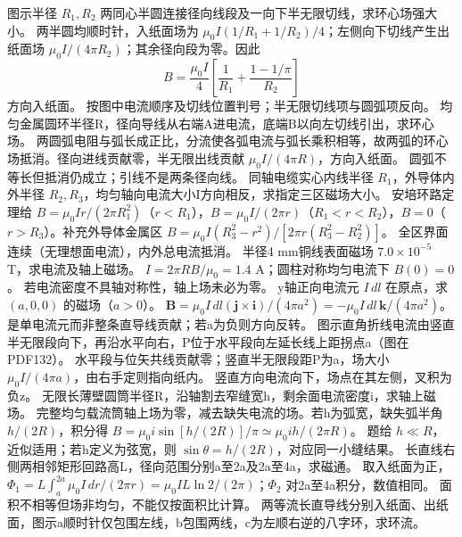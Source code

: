 \problemtext 图示半径 $R_1,R_2$ 两同心半圆连接径向线段及一向下半无限切线，求环心场强大小。
\workings 两半圆均顺时针，入纸面场为 $\mu_0I(1/R_1+1/R_2)/4$；左侧向下切线产生出纸面场 $\mu_0I/(4\pi R_2)$；其余径向段为零。因此
\[
B=\frac{\mu_0I}{4}\left[\frac1{R_1}+\frac{1-1/\pi}{R_2}\right]
\]
方向入纸面。
\crosscheck 按图中电流顺序及切线位置判号；半无限切线项与圆弧项反向。
\problemtext 均匀金属圆环半径R，径向导线从右端A进电流，底端B以向左切线引出，求环心场。
\workings 两圆弧电阻与弧长成正比，分流使各弧电流与弧长乘积相等，故两弧的环心场抵消。径向进线贡献零，半无限出线贡献 $\mu_0I/(4\pi R)$，方向入纸面。
\crosscheck 圆弧不等长但抵消仍成立；引线不是两条径向线。
\problemtext 同轴电缆实心内线半径 $R_1$，外导体内外半径 $R_2,R_3$，均匀轴向电流大小I方向相反，求指定三区磁场大小。
\workings 安培环路定理给 $B=\mu_0Ir/(2\pi R_1^2)$（$r<R_1$），$B=\mu_0I/(2\pi r)$（$R_1<r<R_2$），$B=0$（$r>R_3$）。补充外导体金属区 $B=\mu_0I(R_3^2-r^2)/[2\pi r(R_3^2-R_2^2)]$。
\crosscheck 全区界面连续（无理想面电流），内外总电流抵消。
\problemtext 半径4 mm铜线表面磁场 $7.0\times10^{-5}$ T，求电流及轴上磁场。
\workings $I=2\pi RB/\mu_0=1.4$ A；圆柱对称均匀电流下 $B(0)=0$。
\crosscheck 若电流密度不具轴对称性，轴上场未必为零。
\problemtext y轴正向电流元 $I\,dl$ 在原点，求 $(a,0,0)$ 的磁场（$a>0$）。
\workings $\bm B=\mu_0I\,dl(\bm j\times\bm i)/(4\pi a^2)=-\mu_0I\,dl\,\bm k/(4\pi a^2)$。
\crosscheck 是单电流元而非整条直导线贡献；若a为负则方向反转。
\problemtext 图示直角折线电流由竖直半无限段向下，再沿水平向右，P位于水平段向左延长线上距拐点a（图在PDF132）。
\workings 水平段与位矢共线贡献零；竖直半无限段距P为a，场大小 $\mu_0I/(4\pi a)$，由右手定则指向纸内。
\crosscheck 竖直方向电流向下，场点在其左侧，叉积为负z。
\problemtext 无限长薄壁圆筒半径R，沿轴割去窄缝宽h，剩余面电流密度i，求轴上磁场。
\workings 完整均匀载流筒轴上场为零，减去缺失电流的场。若h为弧宽，缺失弧半角 $h/(2R)$，积分得 $B=\mu_0i\sin[h/(2R)]/\pi\simeq\mu_0ih/(2\pi R)$。
\crosscheck 题给 $h\ll R$，近似适用；若h定义为弦宽，则 $\sin\theta=h/(2R)$，对应同一小缝结果。
\problemtext 长直线右侧两相邻矩形回路高L，径向范围分别a至2a及2a至4a，求磁通。
\workings 取入纸面为正，$\Phi_1=L\int_a^{2a}\mu_0I\,dr/(2\pi r)=\mu_0IL\ln2/(2\pi)$；$\Phi_2$ 对2a至4a积分，数值相同。
\crosscheck 面积不相等但场非均匀，不能仅按面积比计算。
\problemtext 两等流长直导线分别入纸面、出纸面，图示a顺时针仅包围左线，b包围两线，c为左顺右逆的八字环，求环流。
